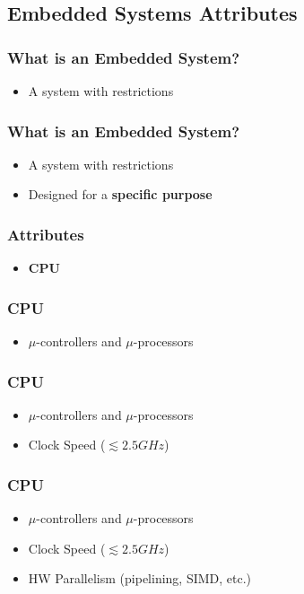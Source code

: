 \subsection[Attribute]{Embedded Systems Attributes}

\begin{frame}
  \frametitle{What is an Embedded System?}
  \begin{itemize}
    \item A system with restrictions
  \end{itemize}
\end{frame}

\begin{frame}
  \frametitle{What is an Embedded System?}
  \begin{itemize}
    \item A system with restrictions
    \item Designed for a {\bf specific purpose}
  \end{itemize}
\end{frame}

\begin{frame}
  \frametitle{Attributes}
  \begin{itemize}
    \item {\bf CPU}
  \end{itemize}
\end{frame}

\begin{frame}
  \frametitle{CPU}
  \begin{itemize}
    \item $\mu$-controllers and $\mu$-processors
  \end{itemize}
\end{frame}

\begin{frame}
  \frametitle{CPU}
  \begin{itemize}
    \item $\mu$-controllers and $\mu$-processors
    \item Clock Speed ($\lesssim 2.5 GHz$)
  \end{itemize}
\end{frame}

\begin{frame}
  \frametitle{CPU}
  \begin{itemize}
    \item $\mu$-controllers and $\mu$-processors
    \item Clock Speed ($\lesssim 2.5 GHz$)
    \item HW Parallelism (pipelining, SIMD, etc.)
  \end{itemize}
\end{frame}

